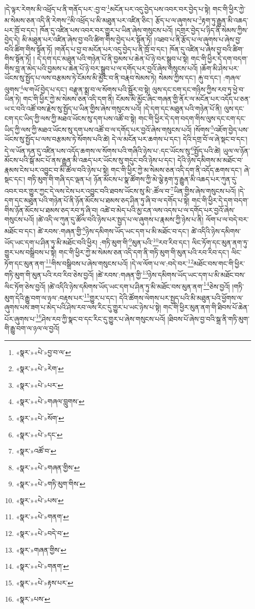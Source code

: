 །དེ་ལྟར་རེགས་མི་འཕྲོད་པ་ནི་གནོད་པར་:བྱ་བ་\footnote{«སྣར་»«པེ་»བྱ་བ་ལ་}མངོན་པར་འདུ་བྱེད་པས་འབར་བར་བྱེད་པ་སྟེ། གང་གི་ཕྱིར་ཀྱེ་མ་སེམས་ཅན་འདི་ནི་རེགས་\footnote{«སྣར་»«པེ་»རེག་}མི་འཕྲོད་པ་མི་མཐུན་པར་འཛིན་ཅིང་། རྩོད་པ་ལ་ཞུགས་པ་\footnote{«སྣར་»«པེ་»པར་}རྟག་ཏུ་རྒྱུན་མི་འཆད་པར་ཁྲོ་བ་དང་། ཁོན་དུ་འཛིན་པས་འབར་བར་གྱུར་པ་ཡིན་ཞེས་གསུངས་པའོ། །དགྲར་བྱེད་པ་ཉིད་ནི་སེམས་ཀྱིས་བྱེད་དེ། མི་མཐུན་པར་འཛིན་ཞེས་བྱ་བའི་ཚིག་གིས་བྱེད་པར་སྟོན་ཏོ། །འཐབ་པ་ནི་རྩོད་པ་ལ་ཞུགས་པ་ཞེས་བྱ་བའི་ཚིག་གིས་སྟོན་ཏོ། །གནོད་པ་བྱ་བ་མངོན་པར་འདུ་བྱེད་པ་ནི་ཁྲོ་བ་དང་། ཁོན་དུ་འཛིན་པ་ཞེས་བྱ་བའི་ཚིག་གིས་སྟོན་ཏོ། །
དེ་དག་དང་མཐུན་པའི་གཉེན་པོ་ནི་བྱམས་པ་ཆེན་པོ་ཉེ་བར་སྒྲུབ་པ་སྟེ། གང་གི་ཕྱིར་དེ་དག་བདག་གིས་བླ་ན་མེད་པའི་བྱམས་པ་ཆེན་པོ་ཉེ་བར་སྒྲུབ་པ་ལ་དགོད་པར་བྱའོ་ཞེས་གསུངས་པའོ། །ཆོག་མི་ཤེས་པར་ཡོངས་སུ་སྤྱོད་པ་ལས་བརྩམས་ཏེ་ངོམས་མི་མྱོང་བ་ནི་བརྣབ་སེམས་ཏེ། སེམས་ཀྱིས་དང་། རྐུ་བ་དང་། :གཞལ་ལུགས་\footnote{«སྣར་»«པེ་»གཞལ་བླུགས་}ལ་གཡོ་བྱེད་པ་དང་། བརྫུན་སྨྲ་བ་ལ་སོགས་པའི་སྦྱོར་བ་སྟེ། ལུས་དང་ངག་དང་གཉིས་ཀྱིས་རབ་ཏུ་ཕྱེ་བ་ཡིན་ཏེ། གང་གི་ཕྱིར་ཀྱེ་མ་སེམས་ཅན་འདི་དག་ནི། ངོམས་མི་མྱོང་ཞིང་གཞན་གྱི་ནོར་ལ་མངོན་པར་འདོད་པ་ཅན་ཡ་ང་བའི་འཚོ་བས་རྗེས་སུ་སྤྱོད་པ་ཡིན་གྱིས་ཞེས་གསུངས་པའོ། །དེ་དག་དང་མཐུན་པའི་གཉེན་པོ་ནི། ལུས་དང་ངག་དང་ཡིད་ཀྱི་ལས་ཀྱི་མཐའ་ཡོངས་སུ་དག་པས་འཚོ་བ་སྟེ། གང་གི་ཕྱིར་དེ་དག་བདག་གིས་ལུས་དང་ངག་དང་ཡིད་ཀྱི་ལས་ཀྱི་མཐའ་ཡོངས་སུ་དག་པས་འཚོ་བ་ལ་དགོད་པར་བྱའོ་ཞེས་གསུངས་པའོ། །སོགས་\footnote{«སྣར་»«པེ་»སོག་}འཇོག་བྱེད་པས་ཡོངས་སུ་སྤྱོད་པ་ལས་བརྩམས་ཏེ་སོགས་པའི་ཚེ། དེ་ལ་མངོན་པར་ཆགས་པ་དང་། དེའི་དགྲ་བོ་ལ་ཞེ་སྡང་བ་དང་། དེ་ལ་ཡོན་ཏན་དུ་འཛིན་པས་འདོད་ཆགས་ལ་སོགས་པའི་གཞིའི་ཉེས་པ་:དང་ཡོངས་སུ་\footnote{«སྣར་»«པེ་»དང་}སྤྱོད་པའི་ཚེ། ཡུལ་ལ་ཉོན་མོངས་པའི་སྒོ་མང་པོ་ནས་རྒྱུན་མི་འཆད་པར་ཡོངས་སུ་གདུང་བའི་ཉེས་པ་དང་། དེའི་ཉེས་དམིགས་མ་མཐོང་བ་རྣམས་ངེས་པར་འབྱུང་བ་མི་ཚོལ་བའི་ཉེས་པ་སྟེ། གང་གི་ཕྱིར་ཀྱེ་མ་སེམས་ཅན་འདི་དག་ནི་འདོད་ཆགས་དང་། ཞེ་སྡང་དང་། གཏི་མུག་གི་གཞི་དང་ལྡན་པ། ཉོན་མོངས་པ་སྣ་ཚོགས་ཀྱི་མེ་ལྕེ་རྟག་ཏུ་རྒྱུན་མི་འཆད་པར་ཀུན་དུ་འབར་བར་གྱུར་ཀྱང་དེ་ལས་ངེས་པར་འབྱུང་བའི་ཐབས་ཡོངས་སུ་མི་:ཚོལ་བ་\footnote{«སྣར་»འཚོ་བ་}ཡིན་གྱིས་ཞེས་གསུངས་པའོ། །དེ་དག་དང་མཐུན་པའི་གཉེན་པོ་ནི་ཉོན་མོངས་པ་ཐམས་ཅད་ཤིན་ཏུ་ཞི་བ་ལ་དགོད་པ་སྟེ། གང་གི་ཕྱིར་དེ་དག་བདག་གིས་ཉོན་མོངས་པ་ཐམས་ཅད་རབ་ཏུ་ཞི་བ། འཚེ་བ་མེད་པའི་མྱ་ངན་ལས་འདས་པ་ལ་དགོད་པར་བྱའོ་ཞེས་གསུངས་པའོ། །ཚེ་འདི་ལ་ཀུན་དུ་ཚོལ་བའི་ཉེས་པར་སྤྱད་པ་ལ་ཞུགས་པ་རྣམས་ཀྱི་ཉེས་པ་ནི། ལོག་པ་ལ་བདེ་བར་མཐོང་བ་དང་། ཚེ་རབས་:གཞན་གྱི་\footnote{«སྣར་»«པེ་»གཞན་གྱིས་}ཉེས་དམིགས་ཡོད་ཡང་དག་པ་མི་མཐོང་བ་དང་། ཚེ་འདིའི་ཉེས་དམིགས་ཡོད་ཡང་དག་པ་ཤིན་ཏུ་མི་མཐོང་བའི་ཕྱིར། :གཏི་མུག་གི་\footnote{«སྣར་»«པེ་»གཏི་མུག་གིས་}མུན་པའི་\footnote{«སྣར་»«པེ་»པས་}རབ་རིབ་དང་། ལིང་ཏོག་དང་མུན་ནག་ཏུ་གྱུར་པས་བསྒྲིབས་པ་སྟེ། གང་གི་ཕྱིར་ཀྱེ་མ་སེམས་ཅན་འདི་དག་ནི་གཏི་མུག་གི་མུན་པའི་རབ་རིབ་དང་། ལིང་ཏོག་དང་མུན་ནག་\footnote{«སྣར་»«པེ་»གནག་}གིས་བསྒྲིབས་པ་ཞེས་གསུངས་པའོ། །དེ་ལ་ལོག་པ་ལ་:བདེ་བར་\footnote{«སྣར་»«པེ་»བདེ་བ་}མཐོང་བས་གང་གི་ཕྱིར་གཏི་མུག་གི་མུན་པའི་རབ་རིབ་ཅེས་བྱའོ། །ཚེ་རབས་:གཞན་གྱི་\footnote{«སྣར་»གཞན་གྱིས་}ཉེས་དམིགས་ཡོད་ཡང་དག་པ་མི་མཐོང་བས་ལིང་ཏོག་ཅེས་བྱའོ། །ཚེ་འདིའི་ཉེས་དམིགས་ཡོད་ཡང་དག་པ་ཤིན་ཏུ་མི་མཐོང་བས་མུན་ནག་\footnote{«སྣར་»«པེ་»གནག་}ཅེས་བྱའོ། །གཏི་མུག་དེའི་རྒྱུ་བག་ལ་ཉལ་:བརྟས་པར་\footnote{«སྣར་»«པེ་»རྟས་པར་}གྱུར་པ་དང་། དེའི་ཚོགས་ལེགས་པར་སྤྱད་པའི་མི་མཐུན་པའི་ཕྱོགས་ལ་ཞུགས་པས་ཟག་པ་མེད་པའི་ཤེས་རབ་ལས་རིང་དུ་གྱུར་པ་ཡང་ཉེས་པ་སྟེ། གང་གི་ཕྱིར་མུན་ནག་གི་ཐིབས་པོ་ཆེན་པོར་ཞུགས་པ་\footnote{«སྣར་»པས་}ཤེས་རབ་ཀྱི་སྣང་བ་དང་རིང་དུ་གྱུར་པ་ཞེས་གསུངས་པའོ། །ཐིབས་པོ་ཞེས་བྱ་བའི་སྒྲ་ནི་གཏི་མུག་གི་རྒྱུ་བག་ལ་ཉལ་ལ་བྱའོ། 